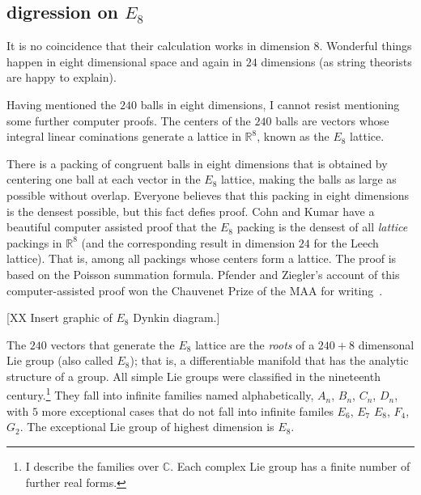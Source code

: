 \documentclass{llncs}
\newcommand{\ring}[1]{\mathbb{#1}}
\begin{document}
\subsection{digression on $E_8$}

It is no coincidence that their calculation works in dimension $8$.
Wonderful things happen in eight dimensional space and again in $24$
dimensions (as string theorists are happy to explain).

Having mentioned the $240$ balls in eight dimensions, I cannot resist
mentioning some further computer proofs.  The centers of the $240$ balls
are vectors whose integral linear cominations generate 
a lattice in $\ring{R}^8$, known as the $E_8$ lattice.

There is a packing of congruent balls in eight dimensions that is
obtained by centering one ball at each vector in the $E_8$ lattice,
making the balls as large as possible without overlap.  Everyone
believes that this packing in eight dimensions is the densest
possible, but this fact defies proof.  Cohn and Kumar have a beautiful
computer assisted proof that the $E_8$ packing is the densest of all
{\it lattice} packings in $\ring{R}^8$ (and the corresponding result in
dimension $24$ for the Leech lattice).  That is, among all packings
whose centers form a lattice.  The proof is based on the Poisson
summation formula.  Pfender and Ziegler's account of this
computer-assisted proof won the Chauvenet Prize of the MAA for
writing~\cite{PZ}.


[XX Insert graphic of $E_8$ Dynkin diagram.]

The $240$ vectors that generate the $E_8$ lattice are the {\it roots}
of a $240+8$ dimensonal Lie group (also called $E_8$); that is, a
differentiable manifold that has the analytic structure of a group.  All simple
Lie groups were classified in the nineteenth century.\footnote{I
  describe the families over $\ring{C}$.  Each complex Lie group has a
  finite number of further real forms.}  They fall into infinite
families named alphabetically, $A_n$, $B_n$, $C_n$, $D_n$, with $5$
more exceptional cases that do not fall into infinite familes $E_6$,
$E_7$ $E_8$, $F_4$, $G_2$.  The exceptional Lie group of highest
dimension is $E_8$.
\end{document}

